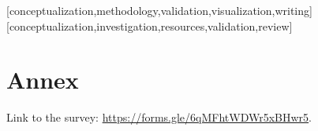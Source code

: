 \documentclass[english]{textolivre}
\begin{document}
\begin{contributors}
[conceptualization,methodology,validation,visualization,writing]
[conceptualization,investigation,resources,validation,review]
\end{contributors}

\begin{dataavailability}
\end{dataavailability}

\appendix 
\section{Annex}\label{apx-longtable}

Link to the survey: \url{https://forms.gle/6qMFhtWDWr5xBHwr5}.
\end{document}

